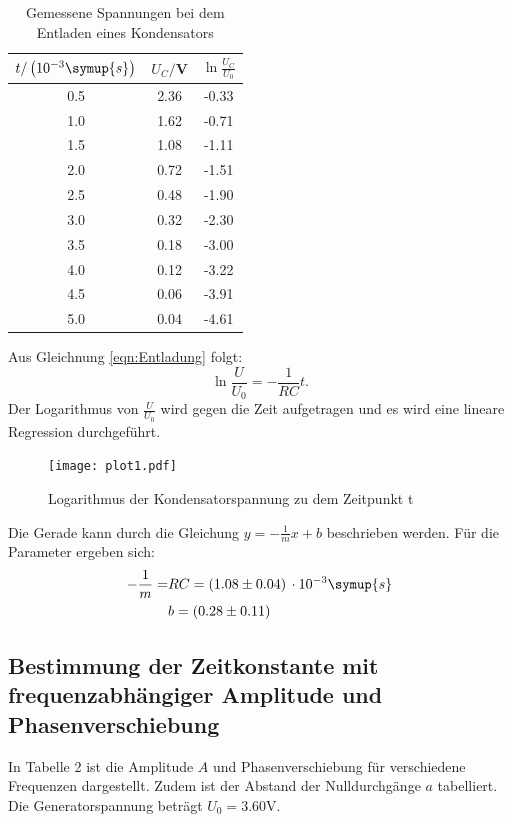 \begin{table}[H]
  \centering
  \caption{Gemessene Spannungen bei dem Entladen eines Kondensators}
  \label{tab:Rechteckspannung}
  \begin{tabular}{c c c}
    \toprule
    $t/\left(10^{-3}\symup{s}\right)$ & $U_C/$V & $\ln{\frac{U_C}{U_0}}$ \\
    \midrule
    0.5 & 2.36 & -0.33 \\
    1.0 & 1.62 & -0.71 \\
    1.5 & 1.08 & -1.11 \\
    2.0 & 0.72 & -1.51 \\
    2.5 & 0.48 & -1.90 \\
    3.0 & 0.32 & -2.30 \\
    3.5 & 0.18 & -3.00 \\
    4.0 & 0.12 & -3.22 \\
    4.5 & 0.06 & -3.91 \\
    5.0 & 0.04 & -4.61 \\
    \bottomrule
  \end{tabular}
\end{table}

Aus Gleichnung \eqref{eqn:Entladung} folgt:
\begin{equation}
  \ln{\frac{U}{U_0}} = -\frac{1}{RC}t.
\end{equation}
Der Logarithmus von $\frac{U}{U_0}$ wird gegen die Zeit aufgetragen und es wird eine lineare Regression durchgeführt.



\begin{figure}[H]
  \centering
  \texttt{[image: plot1.pdf]}
  \caption{Logarithmus der Kondensatorspannung zu dem Zeitpunkt t}
  \label{fig:entladung}
\end{figure}

Die Gerade kann durch die Gleichung $y = -\frac{1}{m}x + b$ beschrieben werden. Für die Parameter ergeben sich:
\begin{align*}
  -\frac{1}{m} = &RC = (1.08 \pm 0.04) \, \cdot 10^{-3} \symup{s} \\
  &b = (0.28 \pm 0.11)
\end{align*}

\subsection{Bestimmung der Zeitkonstante mit frequenzabhängiger Amplitude und Phasenverschiebung}

In Tabelle 2 ist die Amplitude $A$ und Phasenverschiebung für verschiedene Frequenzen dargestellt. Zudem ist der
Abstand der Nulldurchgänge $a$ tabelliert. Die Generatorspannung beträgt $U_0 = 3.60$V.

